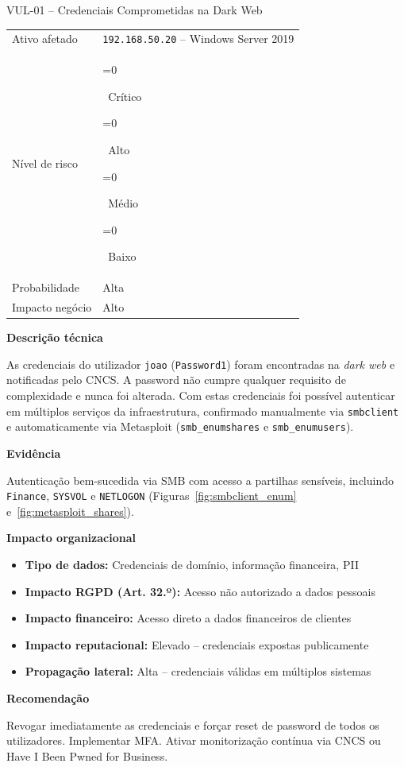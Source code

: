\documentclass[12pt, a4paper]{report}
\newcommand{\risk}[1]{%
  \ifnum\pdfstrcmp{#1}{Critico}=0{\colorbox{Critical}{\color{white}\bfseries\footnotesize\strut~Crítico~}}\fi
  \ifnum\pdfstrcmp{#1}{Alto}=0{\colorbox{High}{\color{white}\bfseries\footnotesize\strut~Alto~}}\fi
  \ifnum\pdfstrcmp{#1}{Medio}=0{\colorbox{Medium}{\color{black}\bfseries\footnotesize\strut~Médio~}}\fi
  \ifnum\pdfstrcmp{#1}{Baixo}=0{\colorbox{Low}{\color{white}\bfseries\footnotesize\strut~Baixo~}}\fi}
\begin{document}
\begin{finding}{VUL-01 -- Credenciais Comprometidas na Dark Web}
\begin{tabular}{@{}ll@{}}
  \small\color{TextGray}Ativo afetado   & \texttt{192.168.50.20} -- Windows Server 2019 \\[3pt]
  \small\color{TextGray}Nível de risco  & \risk{Critico} \\[3pt]
  \small\color{TextGray}Probabilidade   & Alta \\[3pt]
  \small\color{TextGray}Impacto negócio & Alto \\
\end{tabular}

\vspace{8pt}\textbf{Descrição técnica}

As credenciais do utilizador \texttt{joao} (\texttt{Password1}) foram encontradas na
\textit{dark web} e notificadas pelo CNCS. A password não cumpre qualquer requisito de
complexidade e nunca foi alterada. Com estas credenciais foi possível autenticar em múltiplos
serviços da infraestrutura, confirmado manualmente via \texttt{smbclient} e automaticamente
via Metasploit (\texttt{smb\_enumshares} e \texttt{smb\_enumusers}).

\vspace{6pt}\textbf{Evidência}

Autenticação bem-sucedida via SMB com acesso a partilhas sensíveis, incluindo \texttt{Finance},
\texttt{SYSVOL} e \texttt{NETLOGON} (Figuras~\ref{fig:smbclient_enum} e~\ref{fig:metasploit_shares}).

\vspace{4pt}\textbf{Impacto organizacional}
\begin{itemize}[itemsep=1pt]
  \item \textbf{Tipo de dados:} Credenciais de domínio, informação financeira, PII
  \item \textbf{Impacto RGPD (Art. 32.º):} Acesso não autorizado a dados pessoais
  \item \textbf{Impacto financeiro:} Acesso direto a dados financeiros de clientes
  \item \textbf{Impacto reputacional:} Elevado -- credenciais expostas publicamente
  \item \textbf{Propagação lateral:} Alta -- credenciais válidas em múltiplos sistemas
\end{itemize}

\vspace{4pt}\textbf{Recomendação}

Revogar imediatamente as credenciais e forçar reset de password de todos os utilizadores.
Implementar MFA. Ativar monitorização contínua via CNCS ou Have I Been Pwned for Business.
\end{finding}
\end{document}

